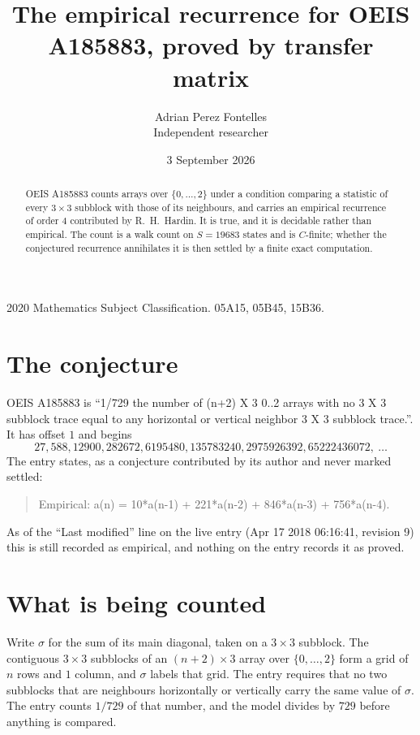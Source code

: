 \documentclass[11pt,a4paper]{article}
\title{The empirical recurrence for OEIS A185883, proved by transfer matrix}
\author{Adrian Perez Fontelles\\ \small Independent researcher}
\date{3 September 2026}
\theoremstyle{plain}
\theoremstyle{definition}
\begin{document}
\maketitle

\begin{abstract}
OEIS A185883 counts arrays over $\{0,\dots,2\}$ under a condition comparing a statistic of
every $3\times3$ subblock with those of its neighbours, and carries an empirical recurrence
of order $4$ contributed by R.~H.~Hardin. It is true, and it is decidable rather than
empirical. The count is a walk count on $S=19683$ states and is $C$-finite; whether the
conjectured recurrence annihilates it is then settled by a finite exact computation.
\end{abstract}

\noindent\small 2020 Mathematics Subject Classification. 05A15, 05B45, 15B36.\normalsize

\section{The conjecture}

OEIS A185883 is ``1/729 the number of (n+2) X 3 0..2 arrays with no 3 X 3 subblock trace equal to any horizontal or vertical neighbor 3 X 3 subblock trace.''. It has offset $1$ and begins
\[
27, 588, 12900, 282672, 6195480, 135783240, 2975926392, 65222436072,\ \dots
\]
The entry states, as a conjecture contributed by its author and never marked settled:
\begin{quote}
Empirical: a(n) = 10*a(n-1) + 221*a(n-2) + 846*a(n-3) + 756*a(n-4).
\end{quote}
As of the ``Last modified'' line on the live entry (Apr 17 2018 06:16:41, revision 9) this is still
recorded as empirical, and nothing on the entry records it as proved.

\section{What is being counted}

Write $\sigma$ for the sum of its main diagonal, taken on a $3\times3$ subblock. The contiguous $3\times3$
subblocks of an $(n+2)\times3$ array over $\{0,\dots,2\}$ form a grid of $n$ rows
and $1$ column, and $\sigma$ labels that grid. The entry
requires that no two subblocks that are neighbours horizontally or vertically carry the same value of $\sigma$. The entry counts $1/729$ of that number, and the model divides by $729$ before anything is compared.
\end{document}
